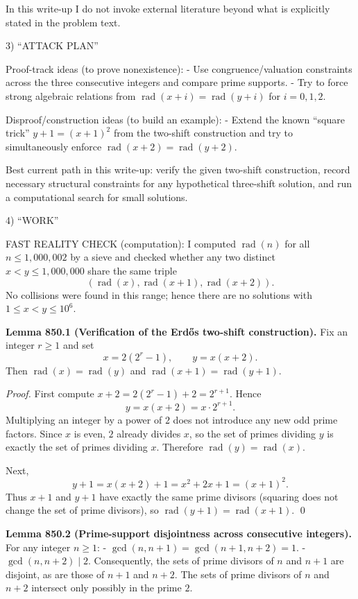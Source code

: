 In this write-up I do not invoke external literature beyond what is explicitly stated in the problem text.

3) “ATTACK PLAN”

Proof-track ideas (to prove nonexistence):
- Use congruence/valuation constraints across the three consecutive integers and compare prime supports.
- Try to force strong algebraic relations from $\operatorname{rad}(x+i)=\operatorname{rad}(y+i)$ for $i=0,1,2$.

Disproof/construction ideas (to build an example):
- Extend the known “square trick” $y+1=(x+1)^2$ from the two-shift construction and try to simultaneously enforce $\operatorname{rad}(x+2)=\operatorname{rad}(y+2)$.

Best current path in this write-up: verify the given two-shift construction, record necessary structural constraints for any hypothetical three-shift solution, and run a computational search for small solutions.

4) “WORK”

FAST REALITY CHECK (computation):
I computed $\operatorname{rad}(n)$ for all $n\le 1{,}000{,}002$ by a sieve and checked whether any two distinct $x<y\le 1{,}000{,}000$ share the same triple
\[
(\operatorname{rad}(x),\operatorname{rad}(x+1),\operatorname{rad}(x+2)).
\]
No collisions were found in this range; hence there are no solutions with $1\le x<y\le 10^6$.

\textbf{Lemma 850.1 (Verification of the Erd\H{o}s two-shift construction).}
Fix an integer $r\ge 1$ and set
\[
x=2(2^r-1),\qquad y=x(x+2).
\]
Then $\operatorname{rad}(x)=\operatorname{rad}(y)$ and $\operatorname{rad}(x+1)=\operatorname{rad}(y+1)$.

\emph{Proof.}
First compute $x+2=2(2^r-1)+2=2^{r+1}$. Hence
\[
y=x(x+2)=x\cdot 2^{r+1}.
\]
Multiplying an integer by a power of $2$ does not introduce any new odd prime factors. Since $x$ is even, $2$ already divides $x$, so the set of primes dividing $y$ is exactly the set of primes dividing $x$. Therefore $\operatorname{rad}(y)=\operatorname{rad}(x)$.

Next,
\[
y+1=x(x+2)+1 = x^2+2x+1=(x+1)^2.
\]
Thus $x+1$ and $y+1$ have exactly the same prime divisors (squaring does not change the set of prime divisors), so $\operatorname{rad}(y+1)=\operatorname{rad}(x+1)$. \qed

\textbf{Lemma 850.2 (Prime-support disjointness across consecutive integers).}
For any integer $n\ge 1$:
- $\gcd(n,n+1)=\gcd(n+1,n+2)=1$.
- $\gcd(n,n+2)\mid 2$.
Consequently, the sets of prime divisors of $n$ and $n+1$ are disjoint, as are those of $n+1$ and $n+2$. The sets of prime divisors of $n$ and $n+2$ intersect only possibly in the prime $2$.


